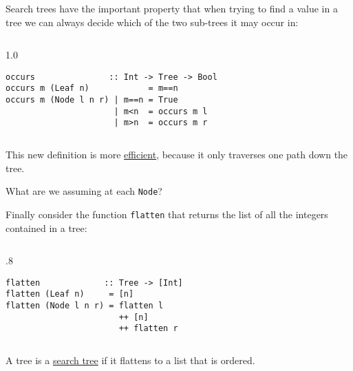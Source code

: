 \documentclass{beamer}
\newenvironment{execblock}[1][.8]{%
\begin{columns}
\begin{column}{#1\linewidth}
\begin{block}{}}{%
\end{block}
\end{column}
\end{columns}}
\def\frameskip{\vskip 0.1in}
\begin{document}
\begin{frame}[fragile]
\large

Search trees have the important property that when 
trying to find a value in a tree we can always decide 
which of the two sub-trees it may occur in: 

\frameskip

\begin{execblock}[1.0]
\begin{verbatim}
occurs               :: Int -> Tree -> Bool 
occurs m (Leaf n)            = m==n 
occurs m (Node l n r) | m==n = True 
                      | m<n  = occurs m l 
                      | m>n  = occurs m r
                      \end{verbatim}
\end{execblock}

\frameskip

This new definition is more \underline{efficient}, because it only 
traverses one path down the tree. 

What are we assuming at each {\tt Node}?

\end{frame}
\begin{frame}[fragile]
\large

Finally consider the function {\tt flatten} that returns the 
list of all the integers contained in a tree: 

\frameskip

\begin{execblock}
\begin{verbatim}
flatten             :: Tree -> [Int] 
flatten (Leaf n)     = [n] 
flatten (Node l n r) = flatten l 
                       ++ [n] 
                       ++ flatten r 
\end{verbatim}
\end{execblock}

\frameskip
\frameskip

A tree is a \underline{search tree} if it flattens to a list that is ordered.
\end{frame}
\end{document}
